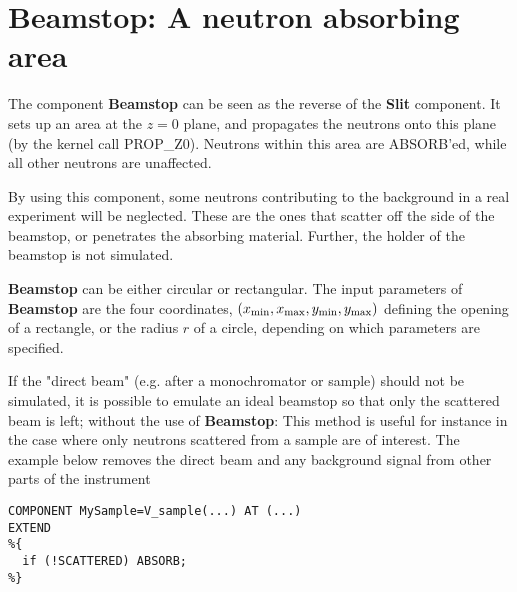 \section{Beamstop: A neutron absorbing area}
\label{beamstop}


The component {\bf Beamstop} can be seen as the reverse of
the {\bf Slit} component.
It sets up an area at the $z=0$ plane, and propagates the neutrons
onto this plane (by the kernel call PROP\_Z0).
Neutrons within this area are ABSORB'ed,
while all other neutrons are unaffected.

By using this component, some neutrons contributing to the background
in a real experiment will be neglected.
These are the ones that scatter off the side
of the beamstop, or penetrates the absorbing material.
Further, the holder of the beamstop is not simulated.

{\bf Beamstop} can be either circular or rectangular.
The input parameters of {\bf Beamstop} are the four coordinates,
$(x_{\rm min}, x_{\rm max}, y_{\rm min}, y_{\rm max})$
defining the opening of a rectangle, or the radius $r$ of
a circle, depending on which parameters are specified.

If the "direct beam" (e.g. after a monochromator or sample) should not be
simulated, it is possible to emulate an ideal beamstop 
so that only the scattered beam is left;
without the use of {\bf Beamstop}:
This method is useful for instance in the case where only neutrons 
scattered from a sample are of interest. 
The example below removes the direct beam and 
any background signal from other parts of the instrument
\begin{lstlisting}
COMPONENT MySample=V_sample(...) AT (...)
EXTEND
%{
  if (!SCATTERED) ABSORB;
%}
\end{lstlisting}
